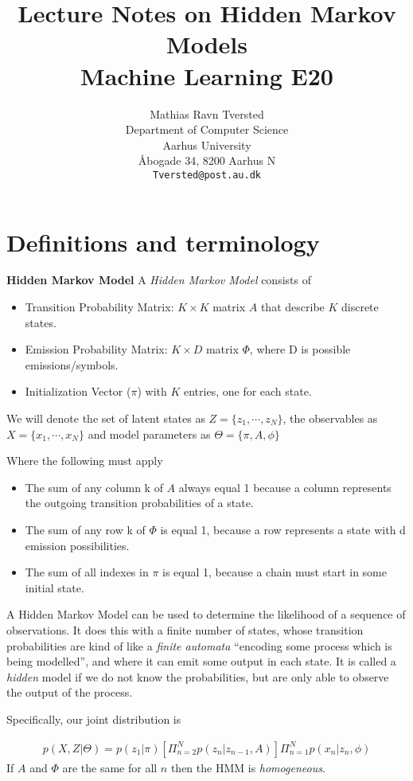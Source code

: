 \documentclass{article}
\title{Lecture Notes on Hidden Markov Models\\Machine Learning E20}
\author{
 Mathias Ravn Tversted \\
  Department of Computer Science\\
  Aarhus University\\
  Åbogade 34, 8200 Aarhus N \\
  \texttt{Tversted@post.au.dk} \\
}
\begin{document}
\maketitle
\tableofcontents

\section{Definitions and terminology}

  \textbf{Hidden Markov Model}
  A \emph{Hidden Markov Model} consists of
  \begin{itemize}
    \item Transition Probability Matrix: $K \times K$ matrix $A$ that describe $K$ discrete states.
    \item Emission Probability Matrix: $K \times D$ matrix $\Phi$, where D is possible emissions/symbols. 
    \item Initialization Vector ($\pi$) with $K$ entries, one for each state.
  \end{itemize}   

  We will denote the set of latent states as $Z = \{z_1, \cdots, z_N\}$, the observables as $X = \{x_1, \cdots, x_N\}$ and model parameters as $\Theta = \{\pi, A, \phi\}$

  Where the following must apply
  \begin{itemize}
    \item The sum of any column k of $A$ always equal 1 because a column represents the outgoing transition probabilities of a state.
    \item The sum of any row k of $\Phi$ is equal 1, because a row represents a state with d emission possibilities.
    \item The sum of all indexes in $\pi$ is equal 1, because a chain must start in some initial state.
  \end{itemize}

  
  A Hidden Markov Model can be used to determine the likelihood of a sequence of observations. 
  It does this with a finite number of states, whose transition probabilities are kind of like a \emph{finite automata} ``encoding some process which is being modelled'', and where it can emit some output in each state.
  It is called a \emph{hidden} model if we do not know the probabilities, but are only able to observe the output of the process.

  Specifically, our joint distribution is 

  \begin{align}
    p(X, Z | \Theta) = p(z_1 | \pi) \left[
      \Pi_{n=2}^{N}{
        p(z_n | z_{n-1}, A)
      }
    \right]
    \Pi_{n=1}^{N}{
      p(x_n | z_n, \phi)
    }
  \end{align}
  If $A$ and $\Phi$ are the same for all $n$ then the HMM is \emph{homogeneous}. 
  
\end{document}
